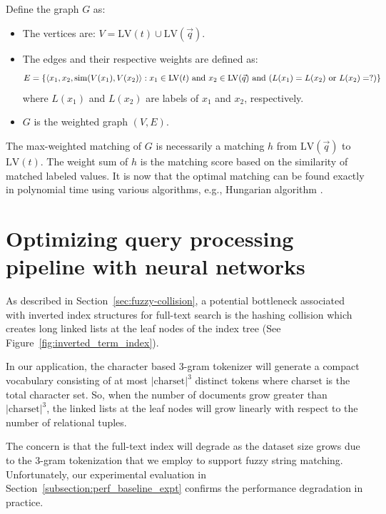 Define the graph $G$ as:
\begin{itemize}
    \item The vertices are: $V = \mathrm{LV}(t)\cup\mathrm{LV}(\vec q)$.
    \item The edges and their respective weights are defined as:
        $$E = \{\left<x_1, x_2, \Sim(V(x_1),V(x_2)\right>: x_1\in\mathrm{LV}(t)\makebox{ and }
        x_2\in\mathrm{LV}(\vec q)
        \makebox{ and } (L(x_1)=L(x_2) \makebox{ or } L(x_2)=?)\}$$ 
       where $L(x_1)$ and $L(x_2)$ are labels of $x_1$ and $x_2$, respectively.
    \item $G$ is the weighted graph $(V, E)$.
\end{itemize}

The max-weighted matching of $G$ is necessarily a matching $h$ from $\mathrm{LV}(\vec q)$ to $\mathrm{LV}(t)$.
The weight sum of $h$ is the matching score based on the similarity of matched labeled values.  It is now that the optimal matching can be
found exactly in polynomial time using various algorithms, e.g., Hungarian algorithm \cite{cormen2022introduction}.



\section{Optimizing query processing pipeline with neural networks}
\label{sec:opt_pipeline}

As described in Section~\ref{sec:fuzzy-collision}, a potential bottleneck associated with inverted index structures for full-text search is the hashing collision which creates long linked lists
at the leaf nodes of the index tree (See Figure~\ref{fig:inverted_term_index}).

In our application, the character based 3-gram tokenizer will generate a compact vocabulary consisting
of at most $|\mathrm{charset}|^3$ distinct tokens where $\mathrm{charset}$ is the total character set.  So, when the number of documents grow greater than $|\mathrm{charset}|^3$, the linked lists at the leaf nodes will grow linearly with respect to the number of relational tuples.

The concern is that the full-text index will degrade as the dataset size grows due to the 3-gram tokenization that we employ to support fuzzy string matching.  Unfortunately, our experimental evaluation in Section~\ref{subsection:perf_baseline_expt} confirms the performance degradation in practice.

